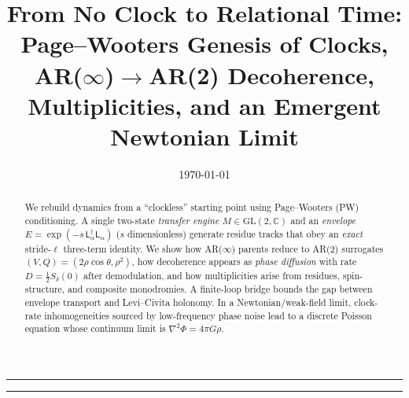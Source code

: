 \documentclass[11pt]{article}
\title{\vspace{-0.8cm}\Large From No Clock to Relational Time:\\
\large Page--Wooters Genesis of Clocks, AR($\infty$)$\to$AR(2) Decoherence, Multiplicities, and an Emergent Newtonian Limit}
\author{}
\date{\today}
\newcommand{\Lap}{\mathsf{L}_\alpha}
\begin{document}
\maketitle
\vspace{-1.2em}\hrule\vspace{0.6em}

\begin{abstract}
We rebuild dynamics from a ``clockless'' starting point using Page--Wooters (PW) conditioning.
A single two-state \emph{transfer engine} $M\!\in\!\mathrm{GL}(2,\mathbb C)$ and an \emph{envelope} $E=\exp(-s\,\Lap^\dagger\Lap)$ ($s$ dimensionless) generate residue tracks that obey an \emph{exact} stride-$\ell$ three-term identity. We show how AR($\infty$) parents reduce to AR(2) surrogates $(V,Q)=(2\rho\cos\theta,\rho^2)$, how decoherence appears as \emph{phase diffusion} with rate $D=\tfrac12 S_\delta(0)$ after demodulation, and how multiplicities arise from residues, spin-structure, and composite monodromies. A finite-loop bridge bounds the gap between envelope transport and Levi--Civita holonomy. In a Newtonian/weak-field limit, clock-rate inhomogeneities sourced by low-frequency phase noise lead to a discrete Poisson equation whose continuum limit is $\nabla^2\Phi=4\pi G\rho$.
\end{abstract}

\tableofcontents
\vspace{0.6em}\hrule\vspace{0.8em}

\end{document}
